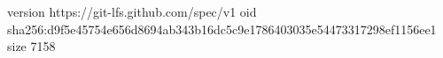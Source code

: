 version https://git-lfs.github.com/spec/v1
oid sha256:d9f5e45754e656d8694ab343b16dc5c9e1786403035e54473317298ef1156ee1
size 7158
